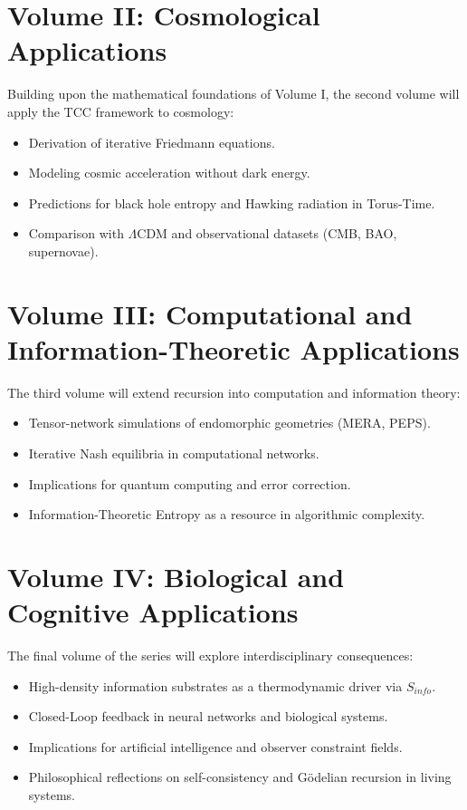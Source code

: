 \documentclass[12pt,openany]{book}
\theoremstyle{plain}
\theoremstyle{definition}
\theoremstyle{remark}
\begin{document}
\section{Volume II: Cosmological Applications}
Building upon the mathematical foundations of Volume I, the second volume will apply 
the TCC framework to cosmology:
\begin{itemize}
    \item Derivation of iterative Friedmann equations.
    \item Modeling cosmic acceleration without dark energy.
    \item Predictions for black hole entropy and Hawking radiation in Torus-Time.
    \item Comparison with $\Lambda$CDM and observational datasets (CMB, BAO, supernovae).
\end{itemize}

\section{Volume III: Computational and Information-Theoretic Applications}
The third volume will extend recursion into computation and information theory:
\begin{itemize}
    \item Tensor-network simulations of endomorphic geometries (MERA, PEPS).
    \item Iterative Nash equilibria in computational networks.
    \item Implications for quantum computing and error correction.
    \item Information-Theoretic Entropy as a resource in algorithmic complexity.
\end{itemize}

\section{Volume IV: Biological and Cognitive Applications}
The final volume of the series will explore interdisciplinary consequences:
\begin{itemize}
    \item High-density information substrates as a thermodynamic driver via $S_{info}$.
    \item Closed-Loop feedback in neural networks and biological systems.
    \item Implications for artificial intelligence and observer constraint fields.
    \item Philosophical reflections on self-consistency and Gödelian recursion in living systems.
\end{itemize}
\end{document}
